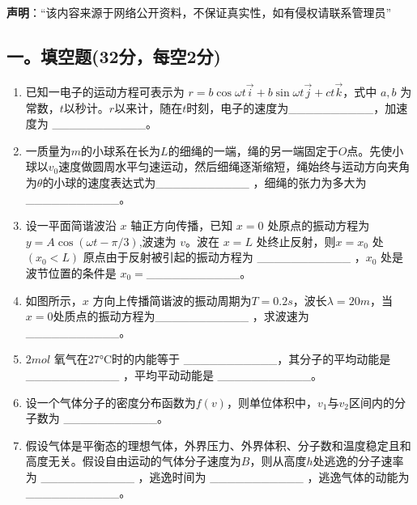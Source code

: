 
\textbf{声明}：“该内容来源于网络公开资料，不保证真实性，如有侵权请联系管理员”

\subsection{一。填空题(32分，每空2分)}
\begin{enumerate}
    \item 已知一电子的运动方程可表示为 $r = b \cos \omega t\vec{i} + b \sin \omega t\vec{j} + ct\vec{k}$，式中 $a,b$ 为常数，$t$以秒计。$r$以来计，随在$t$时刻，电子的速度为__________，加速度为 ___________。
    \item 一质量为$m$的小球系在长为$L$的细绳的一端，绳的另一端固定于$O$点。先使小球以$v_0$速度做圆周水平匀速运动，然后细绳逐渐缩短，绳始终与运动方向夹角为$\theta$的小球的速度表达式为___________ ，细绳的张力为多大为 ___________。
    \item 设一平面简谐波沿 $x$ 轴正方向传播，已知 $x=0$ 处原点的振动方程为$ y = A \cos(\omega t - \pi/3)$,波速为 $v$。波在 $x=L$ 处终止反射，则$x=x_0$ 处 $(x_0 < L)$ 原点由于反射被引起的振动方程为 ___________ ，$x_0$ 处是波节位置的条件是 $x_0 =$___________。
    \item 如图所示，$x$ 方向上传播简谐波的振动周期为$T = 0.2s$，波长$\lambda = 20m$，当$x = 0$处质点的振动方程为___________ ，求波速为 ___________。
    \item $2 mol$ 氧气在27°C时的内能等于 ___________，其分子的平均动能是 ___________ ，平均平动动能是 ___________。
    \item 设一个气体分子的密度分布函数为$f(v)$，则单位体积中，$v_1$与$v_2$区间内的分子数为 ___________。
    \item 假设气体是平衡态的理想气体，外界压力、外界体积、分子数和温度稳定且和高度无关。假设自由运动的气体分子速度为$B$，则从高度$h$处逃逸的分子速率为 ___________ ，逃逸时间为 ___________ ，逃逸气体的动能为 ___________。
\end{enumerate}
